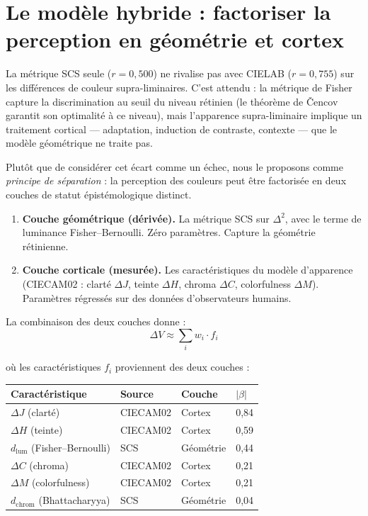 \documentclass[12pt,a4paper]{article}
\begin{document}
\section{Le mod\`ele hybride : factoriser la perception en g\'eom\'etrie et cortex}
\label{sec:hybrid}

La m\'etrique SCS seule ($r = 0{,}500$) ne rivalise pas avec CIELAB
($r = 0{,}755$) sur les diff\'erences de couleur supra-liminaires.
C'est attendu : la m\'etrique de Fisher capture la discrimination au
seuil du niveau r\'etinien (le th\'eor\`eme de \v{C}encov garantit son
optimalit\'e \`a ce niveau), mais l'apparence supra-liminaire implique
un traitement cortical --- adaptation, induction de contraste, contexte
--- que le mod\`ele g\'eom\'etrique ne traite pas.

Plut\^ot que de consid\'erer cet \'ecart comme un \'echec, nous le
proposons comme \emph{principe de s\'eparation} : la perception des
couleurs peut \^etre factoris\'ee en deux couches de statut
\'epist\'emologique distinct.

\begin{enumerate}[nosep]
\item \textbf{Couche g\'eom\'etrique (d\'eriv\'ee).} La m\'etrique SCS
  sur $\Delta^2$, avec le terme de luminance Fisher--Bernoulli.
  Z\'ero param\`etres. Capture la g\'eom\'etrie r\'etinienne.
\item \textbf{Couche corticale (mesur\'ee).} Les caract\'eristiques du
  mod\`ele d'apparence (CIECAM02 : clart\'e $\Delta J$, teinte
  $\Delta H$, chroma $\Delta C$, colorfulness $\Delta M$).
  Param\`etres r\'egress\'es sur des donn\'ees d'observateurs humains.
\end{enumerate}

La combinaison des deux couches donne :
\begin{equation}
\Delta V \approx \sum_i w_i \cdot f_i
\end{equation}

o\`u les caract\'eristiques $f_i$ proviennent des deux couches :

\begin{center}
\begin{tabular}{llll}
\toprule
Caract\'eristique & Source & Couche & $|\beta|$ \\
\midrule
$\Delta J$ (clart\'e) & CIECAM02 & Cortex & 0,84 \\
$\Delta H$ (teinte) & CIECAM02 & Cortex & 0,59 \\
$d_{\mathrm{lum}}$ (Fisher--Bernoulli) & SCS & G\'eom\'etrie & 0,44 \\
$\Delta C$ (chroma) & CIECAM02 & Cortex & 0,21 \\
$\Delta M$ (colorfulness) & CIECAM02 & Cortex & 0,21 \\
$d_{\mathrm{chrom}}$ (Bhattacharyya) & SCS & G\'eom\'etrie & 0,04 \\
\bottomrule
\end{tabular}
\end{center}
\end{document}
